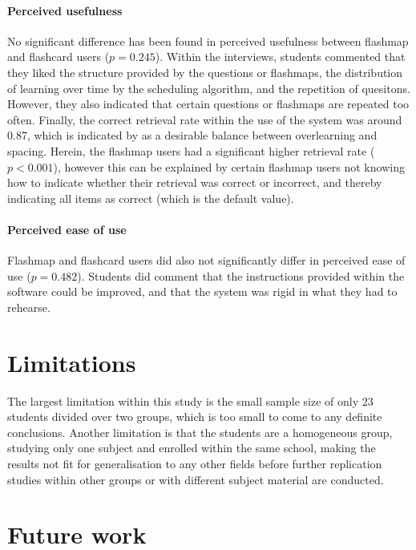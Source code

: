 \paragraph{Perceived usefulness} No significant difference has been found in perceived usefulness between flashmap and flashcard users ($p=0.245$). Within the interviews, students commented that they liked the structure provided by the questions or flashmaps, the distribution of learning over time by the scheduling algorithm, and the repetition of quesitons. However, they also indicated that certain questions or flashmaps are repeated too often. Finally, the correct retrieval rate within the use of the system was around 0.87, which is indicated by  as a desirable balance between overlearning and spacing. Herein, the flashmap users had a significant higher retrieval rate ($p<0.001$), however this can be explained by certain flashmap users not knowing how to indicate whether their retrieval was correct or incorrect, and thereby indicating all items as correct (which is the default value).

\paragraph{Perceived ease of use} Flashmap and flashcard users did also not significantly differ in perceived ease of use ($p=0.482$). Students did comment that the instructions provided within the software could be improved, and that the system was rigid in what they had to rehearse. 

\section{Limitations}

The largest limitation within this study is the small sample size of only 23 students divided over two groups, which is too small to come to any definite conclusions. Another limitation is that the students are a homogeneous group, studying only one subject and enrolled within the same school, making the results not fit for generalisation to any other fields before further replication studies within other groups or with different subject material are conducted.

\section{Future work}

